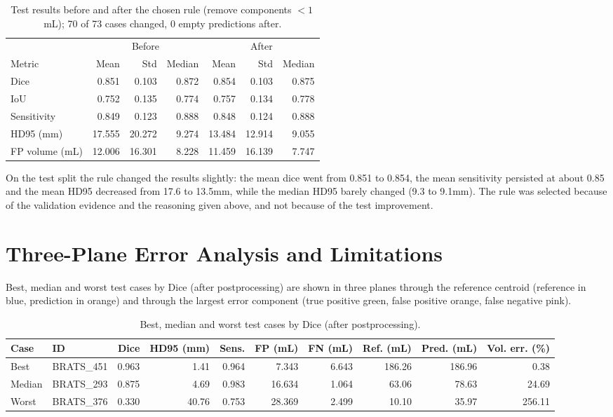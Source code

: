 \documentclass[10pt,a4paper]{article}
\begin{document}
\begin{table}[H]
\centering
\caption{Test results before and after the chosen rule (remove components $<1$\,mL); 70 of 73 cases changed, 0 empty predictions after.}
\small
\begin{tabular}{lrrrrrr}
\toprule
 & \multicolumn{3}{c}{Before} & \multicolumn{3}{c}{After}\\
\cmidrule(lr){2-4}\cmidrule(lr){5-7}
Metric & Mean & Std & Median & Mean & Std & Median\\
\midrule
Dice & 0.851 & 0.103 & 0.872 & 0.854 & 0.103 & 0.875\\
IoU & 0.752 & 0.135 & 0.774 & 0.757 & 0.134 & 0.778\\
Sensitivity & 0.849 & 0.123 & 0.888 & 0.848 & 0.124 & 0.888\\
HD95 (mm) & 17.555 & 20.272 & 9.274 & 13.484 & 12.914 & 9.055\\
FP volume (mL) & 12.006 & 16.301 & 8.228 & 11.459 & 16.139 & 7.747\\
\bottomrule
\end{tabular}
\end{table}

On the test split the rule changed the results slightly: the mean dice went from 0.851 to 0.854, the mean sensitivity persisted at about 0.85 and the mean HD95 decreased from 17.6 to 13.5mm, while the median HD95 barely changed (9.3 to 9.1mm). The rule was selected because of the validation evidence and the reasoning given above, and not because of the test improvement.

\section{Three-Plane Error Analysis and Limitations}
Best, median and worst test cases by Dice (after postprocessing) are shown in three planes through the reference centroid (reference in blue, prediction in orange) and through the largest error component (true positive green, false positive orange, false negative pink).

\begin{table}[H]
\centering
\caption{Best, median and worst test cases by Dice (after postprocessing).}
\scriptsize
\begin{tabular}{llrrrrrrrr}
\toprule
Case & ID & Dice & HD95 (mm) & Sens. & FP (mL) & FN (mL) & Ref. (mL) & Pred. (mL) & Vol. err. (\%)\\
\midrule
Best & BRATS\_451 & 0.963 & 1.41 & 0.964 & 7.343 & 6.643 & 186.26 & 186.96 & 0.38\\
Median & BRATS\_293 & 0.875 & 4.69 & 0.983 & 16.634 & 1.064 & 63.06 & 78.63 & 24.69\\
Worst & BRATS\_376 & 0.330 & 40.76 & 0.753 & 28.369 & 2.499 & 10.10 & 35.97 & 256.11\\
\bottomrule
\end{tabular}
\end{table}
\end{document}

